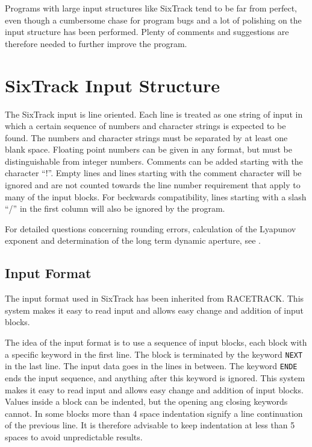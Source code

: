 Programs with large input structures like SixTrack tend to be far from perfect, even though a cumbersome chase for program bugs and a lot of polishing on the input structure has been performed.
Plenty of comments and suggestions are therefore needed to further improve the program.

\section{SixTrack Input Structure}

The SixTrack input is line oriented.
Each line is treated as one string of input in which a certain sequence of numbers and character strings is expected to be found.
The numbers and character strings must be separated by at least one blank space.
Floating point numbers can be given in any format, but must be distinguishable from integer numbers.
Comments can be added starting with the character ``!''.
Empty lines and lines starting with the comment character will be ignored and are not counted towards the line number requirement that apply to many of the input blocks.
For beckwards compatibility, lines starting with a slash ``/'' in the first column will also be ignored by the program.

For detailed questions concerning rounding errors, calculation of the Lyapunov exponent and determination of the long term dynamic aperture, see \cite{thesis}.

\subsection{Input Format} \label{sec:informat}

The input format used in SixTrack has been inherited from RACETRACK.
This system makes it easy to read input and allows easy change and addition of input blocks.

The idea of the input format is to use a sequence of input blocks, each block with a specific keyword in the first line.
The block is terminated by the keyword \texttt{NEXT} in the last line.
The input data goes in the lines in between.
The keyword \texttt{ENDE} ends the input sequence, and anything after this keyword is ignored.
This system makes it easy to read input and allows easy change and addition of input blocks.
Values inside a block can be indented, but the opening ang closing keywords cannot.
In some blocks more than 4 space indentation signify a line continuation of the previous line.
It is therefore advisable to keep indentation at less than 5 spaces to avoid unpredictable results.

